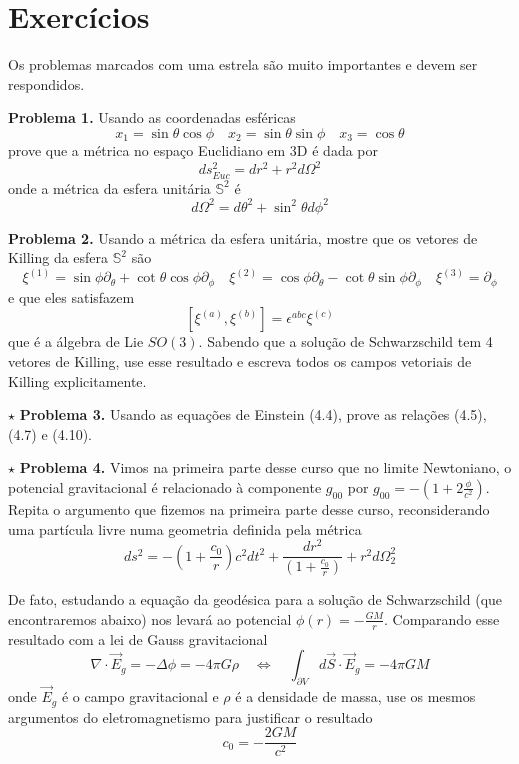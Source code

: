 \documentclass[11pt]{article}
\begin{document}
    \hypertarget{exercuxedcios}{%
\section{Exercícios}\label{exercuxedcios}}

    Os problemas marcados com uma estrela são muito importantes e devem ser
respondidos.

\textbf{Problema 1.} Usando as coordenadas esféricas
\[ x_1 = \sin\theta \cos\phi\quad 
x_2 = \sin\theta \sin\phi\quad  
x_3 = \cos\theta\] prove que a métrica no espaço Euclidiano em 3D é dada
por \[ ds^2_{Euc} = dr^2 + r^2 d\Omega^2 \] onde a métrica da esfera
unitária \(\mathbb{S}^2\) é
\[ d\Omega^2 = d\theta^2 + \sin^2 \theta d\phi^2 \]

\textbf{Problema 2.} Usando a métrica da esfera unitária, mostre que os
vetores de Killing da esfera \(\mathbb{S}^2\) são \[ 
\xi^{(1)} = \sin\phi \partial_\theta + \cot\theta\cos\phi \partial_\phi\quad 
\xi^{(2)} = \cos\phi \partial_\theta - \cot\theta\sin\phi \partial_\phi \quad
\xi^{(3)} = \partial_\phi
\] e que eles satisfazem
\[ [\xi^{(a)}, \xi^{(b)}] = \epsilon^{abc}\xi^{(c)}  \] que é a álgebra
de Lie \(SO(3)\). Sabendo que a solução de Schwarzschild tem 4 vetores
de Killing, use esse resultado e escreva todos os campos vetoriais de
Killing explicitamente.

\(\star\) \textbf{Problema 3.} Usando as equações de Einstein (4.4),
prove as relações (4.5), (4.7) e (4.10).

\(\star\) \textbf{Problema 4.} Vimos na primeira parte desse curso que
no limite Newtoniano, o potencial gravitacional é relacionado à
componente \(g_{00}\) por
\(g_{00} = -\left(1 + 2\frac{\phi}{c^2}\right)\). Repita o argumento que
fizemos na primeira parte desse curso, reconsiderando uma partícula
livre numa geometria definida pela métrica
\[ ds^2 = -\left(1 + \frac{c_0}{r}\right) c^2 dt^2 + \frac{dr^2}{\left(1 + \frac{c_0}{r}\right)} + r^2 d\Omega_2^2 \]

De fato, estudando a equação da geodésica para a solução de
Schwarzschild (que encontraremos abaixo) nos levará ao potencial
\(\phi(r) = - \frac{GM}{r}\). Comparando esse resultado com a lei de
Gauss gravitacional
\[\nabla\cdot \vec{E}_g = -\Delta\phi = - 4 \pi G \rho  \quad \Leftrightarrow \quad 
\int_{\partial V} d \vec{S}\cdot \vec{E}_g  = -4 \pi G M \] onde
\(\vec{E}_g\) é o campo gravitacional e \(\rho\) é a densidade de massa,
use os mesmos argumentos do eletromagnetismo para justificar o resultado
\[ c_0 = - \frac{2GM}{c^2} \]
\end{document}
